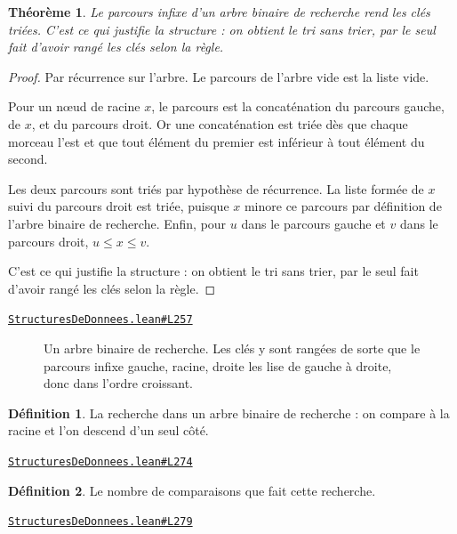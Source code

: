 \documentclass[11pt,a4paper]{article}
\theoremstyle{definition}
\newtheorem{definition}{Définition}
\theoremstyle{plain}
\newtheorem{theoreme}{Théorème}
\newcommand{\source}[2]{\par\smallskip\noindent\hfill{\footnotesize\href{#1}{\texttt{#2}}}\par\smallskip}
\begin{document}
\begin{theoreme}
Le parcours infixe d'un arbre binaire de recherche rend les clés triées. C'est ce
qui justifie la structure : on obtient le tri sans trier, par le seul fait d'avoir
rangé les clés selon la règle.
\end{theoreme}
\begin{proof}
Par récurrence sur l'arbre. Le parcours de l'arbre vide est la liste vide.

Pour un nœud de racine \(x\), le parcours est la concaténation du parcours gauche, de
\(x\), et du parcours droit. Or une concaténation est triée dès que chaque morceau
l'est et que tout élément du premier est inférieur à tout élément du second.

Les deux parcours sont triés par hypothèse de récurrence. La liste formée de \(x\) suivi
du parcours droit est triée, puisque \(x\) minore ce parcours par définition de l'arbre
binaire de recherche. Enfin, pour \(u\) dans le parcours gauche et \(v\) dans le
parcours droit, \(u \le x \le v\).

C'est ce qui justifie la structure : on obtient le tri sans trier, par le seul fait
d'avoir rangé les clés selon la règle.
\end{proof}
\source{https://github.com/Commutator-IO/learn-lean/blob/main/courses/02-lycee/11-informatique-nsi/StructuresDeDonnees.lean\#L257}{StructuresDeDonnees.lean\#L257}

\begin{figure}[h]
\centering

\caption{Un arbre binaire de recherche. Les clés y sont rangées de sorte que le parcours infixe \textemdash{} gauche, racine, droite \textemdash{} les lise de gauche à droite, donc dans l'ordre croissant.}
\end{figure}

\begin{definition}
La recherche dans un arbre binaire de recherche : on compare à la racine et l'on
descend d'un seul côté.
\end{definition}
\source{https://github.com/Commutator-IO/learn-lean/blob/main/courses/02-lycee/11-informatique-nsi/StructuresDeDonnees.lean\#L274}{StructuresDeDonnees.lean\#L274}

\begin{definition}
Le nombre de comparaisons que fait cette recherche.
\end{definition}
\source{https://github.com/Commutator-IO/learn-lean/blob/main/courses/02-lycee/11-informatique-nsi/StructuresDeDonnees.lean\#L279}{StructuresDeDonnees.lean\#L279}
\end{document}
